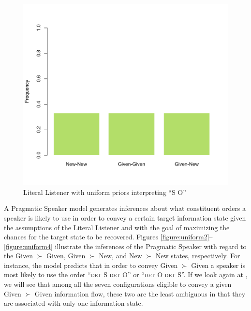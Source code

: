 \documentclass[output=paper,modfonts,nonflat]{langsci/langscibook}
\begin{document}
\begin{figure}
\includegraphics[scale = 0.4]{figures/plotLiteralListenerSbjObjUniform}
\caption{Literal Listener with uniform priors interpreting ``S O''}\label{figure:uniform1}
\end{figure}

A Pragmatic Speaker model generates inferences about what constituent orders a speaker is likely to use in order to convey a certain target information state given the assumptions of the Literal Listener and with the goal of maximizing the chances for the target state to be recovered. Figures \ref{figure:uniform2}--\ref{figure:uniform4} illustrate the inferences of the Pragmatic Speaker with regard to the Given $\succ$ Given, Given $\succ$ New, and New $\succ$ New states, respectively. For instance, the model predicts that in order to convey Given $\succ$ Given a speaker is most likely to use the order ``{\scshape det} S {\scshape det} O'' or ``{\scshape det} O {\scshape det} S''. If we look again at , we will see that among all the seven configurations eligible to convey a given Given $\succ$ Given information flow, these two are the least ambiguous in that they are associated with only one information state.
\end{document}

